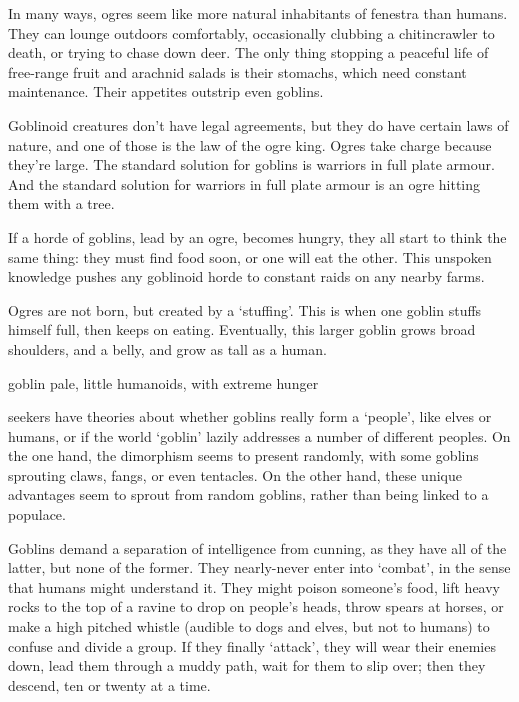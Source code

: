 \begin{multicols}{2}

\noindent
In many ways, ogres seem like more natural inhabitants of \gls{fenestra} than humans.
They can lounge outdoors comfortably, occasionally clubbing a chitincrawler to death, or trying to chase down deer.
The only thing stopping a peaceful life of free-range fruit and arachnid salads is their stomachs, which need constant maintenance.
Their appetites outstrip even goblins.

Goblinoid creatures don't have legal agreements, but they do have certain laws of nature, and one of those is the law of the ogre king.
Ogres take charge because they're large.
The standard solution for goblins is warriors in full plate armour.
And the standard solution for warriors in full plate armour is an ogre hitting them with a tree.

If a horde of goblins, lead by an ogre, becomes hungry, they all start to think the same thing: they must find food soon, or one will eat the other.
This unspoken knowledge pushes any goblinoid horde to constant raids on any nearby farms.

Ogres are not born, but created by a `stuffing'.
This is when one goblin stuffs himself full, then keeps on eating.
Eventually, this larger goblin grows broad shoulders, and a belly, and grow as tall as a human.

  {goblin}%
  {pale, little humanoids, with extreme hunger}%

\Glspl{seeker} have theories about whether goblins really form a `people', like elves or humans, or if the world `goblin' lazily addresses a number of different peoples.
On the one hand, the dimorphism seems to present randomly, with some goblins sprouting claws, fangs, or even tentacles.
On the other hand, these unique advantages seem to sprout from random goblins, rather than being linked to a populace.

Goblins demand a separation of intelligence from cunning, as they have all of the latter, but none of the former.
They nearly-never enter into `combat', in the sense that humans might understand it.
They might poison someone's food, lift heavy rocks to the top of a ravine to drop on people's heads, throw spears at horses, or make a high pitched whistle (audible to dogs and elves, but not to humans) to confuse and divide a group.
If they finally `attack', they will wear their enemies down, lead them through a muddy path, wait for them to slip over; then they descend, ten or twenty at a time.


\end{multicols}
